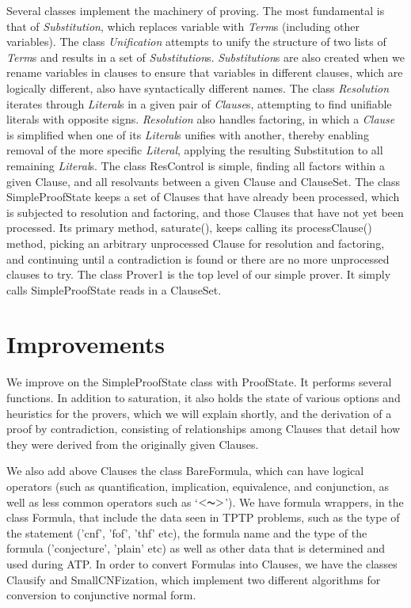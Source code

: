 \documentclass{llncs}
\begin{document}
Several classes implement the machinery of proving.  The most
fundamental is that of \emph{Substitution}, which replaces variable with
\emph{Term}s (including other variables).  The class \emph{Unification} attempts to
unify the structure of two lists of \emph{Term}s and results in a set of
\emph{Substitution}s.  \emph{Substitution}s are also created when we rename
variables in clauses to ensure that variables in different clauses,
which are logically different, also have syntactically different
names.  The class \emph{Resolution} iterates through \emph{Literal}s in a given pair
of \emph{Clause}s, attempting to find unifiable literals with opposite signs.
\emph{Resolution} also handles factoring, in which a \emph{Clause} is simplified
when one of its \emph{Literal}s unifies with another, thereby enabling
removal of the more specific \emph{Literal}, applying the resulting
Substitution to all remaining \emph{Literal}s.  The class ResControl is
simple, finding all factors within a given Clause, and all resolvants
between a given Clause and ClauseSet.  The class SimpleProofState
keeps a set of Clauses that have already been processed, which is
subjected to resolution and factoring, and those Clauses that have not
yet been processed.  Its primary method, saturate(), keeps calling its
processClause() method, picking an arbitrary unprocessed Clause for
resolution and factoring, and continuing until a contradiction is
found or there are no more unprocessed clauses to try.  The class
Prover1 is the top level of our simple prover.  It simply calls
SimpleProofState reads in a ClauseSet.

\section{Improvements}

We improve on the SimpleProofState class with ProofState. It performs
several functions.  In addition to saturation, it also holds the state
of various options and heuristics for the provers, which we will
explain shortly, and the derivation of a proof by contradiction,
consisting of relationships among Clauses that detail how they were
derived from the originally given Clauses.

We also add above Clauses the class BareFormula, which can have
logical operators (such as quantification, implication, equivalence,
and conjunction, as well as less common operators such as
`$<\thicksim>$').  We have formula wrappers, in the class Formula,
that include the data seen in TPTP problems, such as the type of the
statement ('cnf', 'fof', 'thf' etc), the formula name and the type of
the formula ('conjecture', 'plain' etc) as well as other data that is
determined and used during ATP. In order to convert Formulas into
Clauses, we have the classes Clausify and SmallCNFization, which
implement two different algorithms for conversion to conjunctive normal
form.
\end{document}
